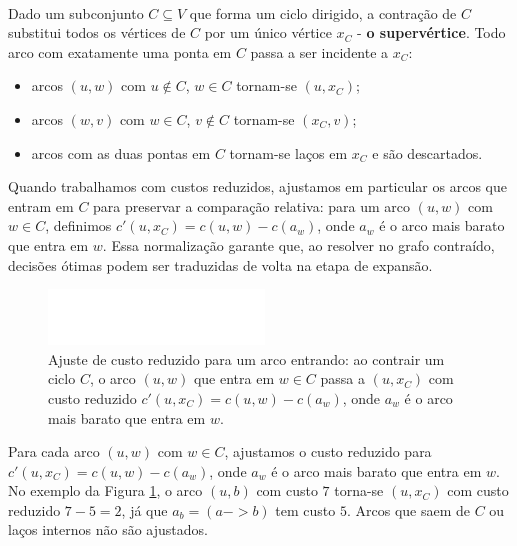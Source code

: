 \documentclass[12pt,a4paper]{article}
\def\emph#1{#1}%
\def\to{->}%
\begin{document}
\paragraph{}
Dado um subconjunto \(C\subseteq V\) que forma um ciclo dirigido, a \emph{contração de \(C\)} substitui todos os vértices de \(C\) por um único vértice \(x_C\) - \textbf{o supervértice}. Todo arco com exatamente uma ponta em \(C\) passa a ser incidente a \(x_C\):
\begin{itemize}\setlength{\itemsep}{2pt}
    \item arcos \((u,w)\) com \(u\notin C\), \(w\in C\) tornam-se \((u, x_C)\);
    \item arcos \((w,v)\) com \(w\in C\), \(v\notin C\) tornam-se \((x_C, v)\);
    \item arcos com as duas pontas em \(C\) tornam-se laços em \(x_C\) e são descartados.
\end{itemize}
Quando trabalhamos com \emph{custos reduzidos}, ajustamos em particular os arcos que \emph{entram} em \(C\) para preservar a comparação relativa: para um arco \((u,w)\) com \(w\in C\), definimos \(c'(u,x_C) = c(u,w) - c(a_w)\), onde \(a_w\) é o arco mais barato que entra em \(w\). Essa normalização garante que, ao resolver no grafo contraído, decisões ótimas podem ser traduzidas de volta na etapa de expansão.


\begin{figure}[H]
    \centering
    \includegraphics[width=0.9\linewidth]{figures/fig_chu_liu_reduced_cost.pdf}

    \caption{Ajuste de custo reduzido para um arco \emph{entrando}: ao contrair um ciclo $C$, o arco $(u,w)$ que entra em $w\in C$ passa a $(u,x_C)$ com custo reduzido $c'(u,x_C)=c(u,w)-c(a_w)$, onde $a_w$ é o arco mais barato que entra em $w$.}
    \label{fig:chu-liu-reduced-cost}
    \end{figure}


Para cada arco \((u,w)\) com \(w\in C\), ajustamos o custo reduzido para \(c'(u,x_C)=c(u,w)-c(a_w)\), onde \(a_w\) é o arco mais barato que entra em \(w\). No exemplo da Figura \ref{fig:chu-liu-reduced-cost}, o arco \((u,b)\) com custo \(7\) torna-se \((u,x_C)\) com custo reduzido \(7-5=2\), já que \(a_b=(a\to b)\) tem custo \(5\). Arcos que saem de \(C\) ou laços internos não são ajustados.
\end{document}
